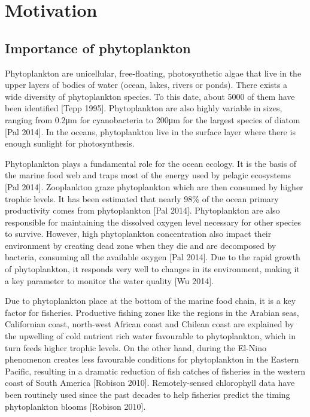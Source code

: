 

\chapter{Motivation}

\section{Importance of phytoplankton}

Phytoplankton are unicellular, free-floating, photosynthetic algae that live in the upper layers of bodies of water (ocean, lakes, rivers or ponds). There exists a wide diversity of phytoplankton species. To this date, about 5000 of them have been identified [Tepp 1995]. Phytoplankton are also highly variable in sizes, ranging from 0.2μm for cyanobacteria to 200μm for the largest species of diatom [Pal 2014]. In the oceans, phytoplankton live in the surface layer where there is enough sunlight for photosynthesis. 

Phytoplankton plays a fundamental role for the ocean ecology. It is the basis of the marine food web and traps most of the energy used by pelagic ecosystems [Pal 2014]. Zooplankton graze phytoplankton which are then consumed by higher trophic levels. It has been estimated that nearly 98\% of the ocean primary productivity comes from phytoplankton [Pal 2014]. Phytoplankton are also responsible for maintaining the dissolved oxygen level necessary for other species to survive. However, high phytoplankton concentration also impact their environment by creating dead zone when they die and are decomposed by bacteria, consuming all the available oxygen [Pal 2014]. Due to the rapid growth of phytoplankton, it responds very well to changes in its environment, making it a key parameter to monitor the water quality [Wu 2014].

Due to phytoplankton place at the bottom of the marine food chain, it is a key factor for fisheries. Productive fishing zones like the regions in the Arabian seas, Californian coast, north-west African coast and Chilean coast are explained by the upwelling of cold nutrient rich water favourable to phytoplankton, which in turn feeds higher trophic levels. On the other hand, during the El-Nino phenomenon creates less favourable conditions for phytoplankton in the Eastern Pacific, resulting in a dramatic reduction of fish catches of fisheries in the western coast of South America [Robison 2010]. Remotely-sensed chlorophyll data have been routinely used since the past decades to help fisheries predict the timing phytoplankton blooms [Robison 2010]. 

